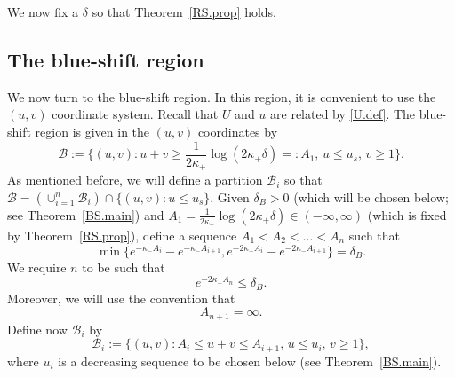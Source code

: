 \documentclass[10pt, reqno]{amsart}
\theoremstyle{definition}
\theoremstyle{remark}
\numberwithin{equation}{section}
\newcommand{\0}{\emptyset}
\newcommand{\f}{\frac}
\newcommand{\de}{\delta}
\begin{document}
We now fix a $\de$ so that Theorem~\ref{RS.prop} holds.

\subsection{The blue-shift region}\label{sec.BS}
We now turn to the blue-shift region. In this region, it is convenient to use the $(u,v)$ coordinate system. Recall that $U$ and $u$ are related by \eqref{U.def}. The blue-shift region is given in the $(u,v)$ coordinates by
$$\mathcal B:=\{(u,v) :u+v\geq \f{1}{2\kappa_+}\log (2\kappa_+\de)=:A_1,\, u\leq u_s,\,v\geq 1\}. $$
As mentioned before, we will define a partition $\mathcal B_i$ so that $\mathcal B=(\cup_{i=1}^n \mathcal B_i)\cap \{(u,v): u\leq u_s\}$. Given $\de_B>0$ (which will be chosen below; see Theorem~\ref{BS.main}) and $A_1=\f{1}{2\kappa_+}\log (2\kappa_+\de) \in (-\infty,\infty)$ (which is fixed by Theorem~\ref{RS.prop}), define a sequence $A_1< A_2<...< A_n$ such that 
$$\min\{e^{-\kappa_- A_i}-e^{-\kappa_- A_{i+1}},e^{-2\kappa_- A_i}-e^{-2\kappa_- A_{i+1}}\}=\de_B.$$
We require $n$ to be such that 
$$e^{-2\kappa_- A_n}\leq \de_B.$$
Moreover, we will use the convention that 
$$A_{n+1}=\infty.$$
Define now $\mathcal B_i$ by
$$\mathcal B_i:=\{(u,v):A_i\leq u+v\leq A_{i+1},\,u\leq u_i,\, v\geq 1\},$$
where $u_i$ is a decreasing sequence to be chosen below (see Theorem~\ref{BS.main}).
\end{document}
